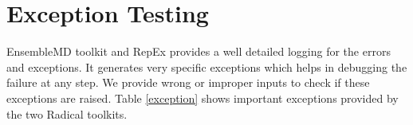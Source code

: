 \documentclass[10pt]{ruthesis}
\begin{document}

\section{Exception Testing}
EnsembleMD toolkit and RepEx provides a well detailed logging for the errors and exceptions. It generates very specific exceptions which helps in debugging the failure at any step. We provide wrong or improper inputs to check if these exceptions are raised. Table \ref{exception} shows important exceptions provided by the two Radical toolkits.
\end{document}
